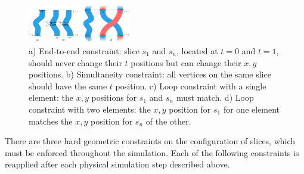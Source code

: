 \begin{figure}[t]
\centering
\includegraphics[width=0.4\textwidth]{figures/animationpak/constraints.pdf} 
\caption[Constraints]
{\label{fig_animationpak_constraints} 
a) End-to-end constraint: 
slice $s_1$ and $s_n$, located at 
$t = 0$ and $t = 1$,  should never change their $t$ positions but can change their $x, y$ positions. 
b) Simultaneity constraint: all vertices on the same slice should have the same $t$ position.
c) Loop constraint with a single element: the $x,y$ positions for $s_1$ and $s_n$ must match.
d) Loop constraint with two elements: the $x, y$ position for $s_1$  for one element matches the $x, y$ position for $s_n$ of the other.
}
\end{figure}



There are three hard geometric constraints on the configuration of slices,
which must be enforced throughout the simulation.  Each of the following
constraints is reapplied after each physical simulation step described above.

